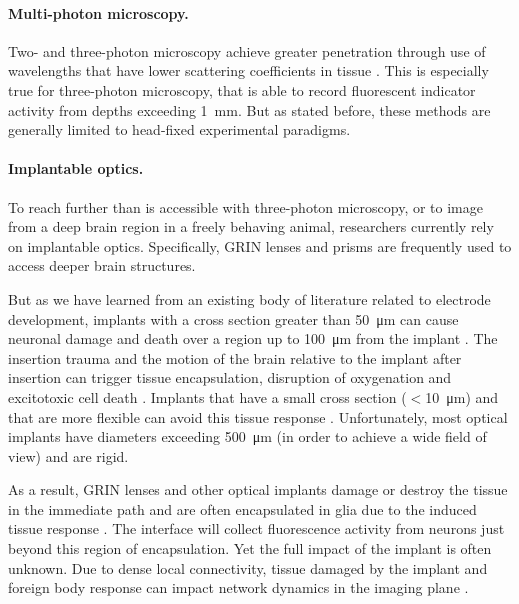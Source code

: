 \paragraph{Multi-photon microscopy.} Two- and three-photon 
microscopy achieve greater penetration through use of 
wavelengths that have lower scattering coefficients in 
tissue \cite{Wang:2017jp}. This is especially true for 
three-photon microscopy, that is able to record 
fluorescent indicator activity from depths exceeding 1~mm.
But as stated before, these methods are generally 
limited to head-fixed experimental paradigms.

\paragraph{Implantable optics.} To reach further than 
is accessible with three-photon microscopy, or to image 
from a deep brain region in a freely behaving animal, 
researchers currently rely on implantable optics. 
Specifically, GRIN lenses \cite{Barretto:2009hk} and 
prisms \cite{Andermann:2013kc} are frequently used to 
access deeper brain structures.

But as we have learned from an existing body of literature related to 
electrode development, implants with a cross section 
greater than 50~\si{\micro\meter} can cause neuronal 
damage and death over a region up to 100~\si{\micro\meter}
from the implant \cite{Seymour:2007dj}. The insertion 
trauma and the motion of the brain relative to the implant 
after insertion can trigger tissue encapsulation, 
disruption of oxygenation and excitotoxic cell death
\cite{Szarowski:2003cz,Polikov:2005cq,McConnell:2009hr,Freire:2011gl}.
Implants that have a small cross section ($<$10~\si{\micro\meter}) 
and that are more flexible can avoid this tissue response 
\cite{JohnPSeymour:2006td,Harris:2011dy,Kozai:2012bp,Patel:2018cr}.
Unfortunately, most optical implants have diameters exceeding 
500~\si{\micro\meter} (in order to achieve a wide field of view) 
and are rigid.

As a result, GRIN lenses and other optical implants damage 
or destroy the tissue in the immediate path and 
are often encapsulated in glia due to the induced  
tissue response \cite{Lee:2016ko}. The interface will 
collect fluorescence activity from neurons just beyond this 
region of encapsulation. Yet the full impact of the implant 
is often unknown. Due to dense local connectivity, tissue 
damaged by the implant and foreign body response can impact 
network dynamics in the imaging plane 
\cite{Hayn:2015ew,Hayn:2017kj,GossVarley:2017kf}.

